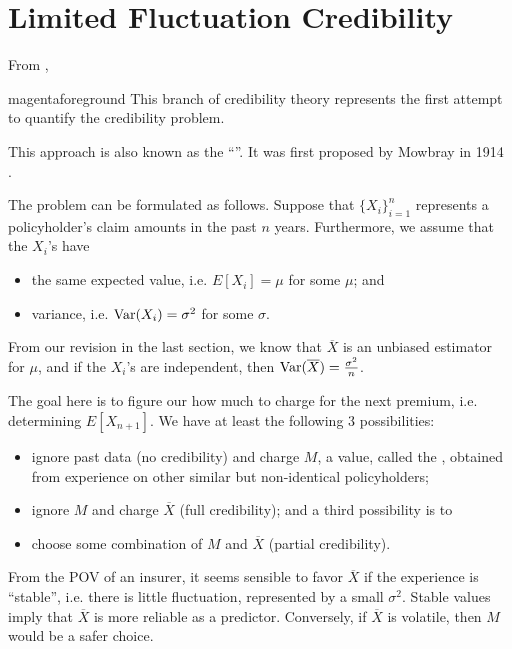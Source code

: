 \documentclass[notoc,notitlepage]{tufte-book}
\begin{document}
\section{Limited Fluctuation Credibility}%
\label{sec:limited_fluctuation_credibility}

From \citealt{klugman2012},
\begin{quotebox}{magenta}{foreground}
  This branch of credibility theory represents the first attempt to quantify the
  credibility problem.
\end{quotebox}
This approach is also known as the ``''. It was
first proposed by Mowbray in 1914 \cite{mowbray1914}.

The problem can be formulated as follows. Suppose that $\{ X_i \}_{i=1}^n$
represents a policyholder's claim amounts in the past $n$ years. Furthermore, we
assume that the $X_i$'s have
\begin{itemize}
  \item the same expected value, i.e. $E[X_i] = \mu$ for some $\mu$; and
  \item variance, i.e. $\operatorname{Var}(X_i) = \sigma^2$ for some $\sigma$.
\end{itemize}
From our revision in the last section, we know that $\overline{X}$ is an
unbiased estimator for $\mu$, and if the $X_i$'s are independent, then
$\operatorname{Var}(\overline{X}) = \frac{\sigma^2}{n}$.

The goal here is to figure our how much to charge for the next premium, i.e.
determining $E[X_{n+1}]$. We have at least the following 3 possibilities:
\begin{itemize}
  \item ignore past data (no credibility) and charge $M$, a value, called the
     , obtained from
    experience on other similar but non-identical policyholders;
  \item ignore $M$ and charge $\overline{X}$ (full credibility); and a third
    possibility is to
  \item choose some combination of $M$ and $\overline{X}$ (partial
    credibility).
\end{itemize}

From the POV of an insurer, it seems sensible to favor $\overline{X}$ if the
experience is ``stable'', i.e. there is little fluctuation, represented by a
small $\sigma^2$. Stable values imply that $\overline{X}$ is more reliable as a
predictor. Conversely, if $\overline{X}$ is volatile, then $M$ would be a safer
choice.
\end{document}

